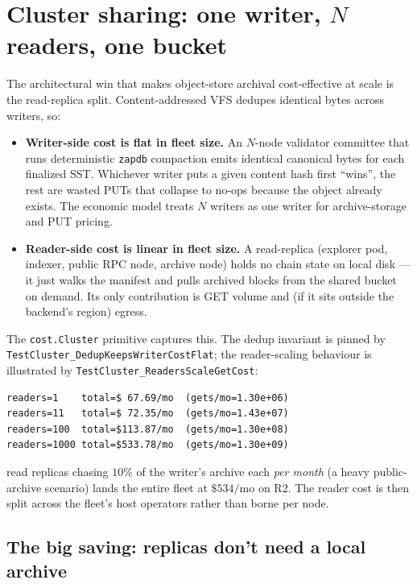 \documentclass[11pt,a4paper]{article}
\begin{document}
\section{Cluster sharing: one writer, $N$ readers, one bucket}
\label{sec:cluster}

The architectural win that makes object-store archival cost-effective
at scale is the read-replica split. Content-addressed VFS dedupes
identical bytes across writers, so:

\begin{itemize}[noitemsep]
  \item \textbf{Writer-side cost is flat in fleet size.} An $N$-node
    validator committee that runs deterministic \texttt{zapdb}
    compaction emits identical canonical bytes for each finalized SST.
    Whichever writer puts a given content hash first ``wins'', the
    rest are wasted PUTs that collapse to no-ops because the object
    already exists. The economic model treats $N$ writers as one
    writer for archive-storage and PUT pricing.
  \item \textbf{Reader-side cost is linear in fleet size.} A
    read-replica (explorer pod, indexer, public RPC node, archive
    node) holds no chain state on local disk --- it just walks the
    manifest and pulls archived blocks from the shared bucket on
    demand. Its only contribution is GET volume and (if it sits
    outside the backend's region) egress.
\end{itemize}

The \texttt{cost.Cluster} primitive captures this. The dedup
invariant is pinned by
\texttt{TestCluster\_DedupKeepsWriterCostFlat}; the reader-scaling
behaviour is illustrated by
\texttt{TestCluster\_ReadersScaleGetCost}:

\begin{lstlisting}
readers=1    total=$ 67.69/mo  (gets/mo=1.30e+06)
readers=11   total=$ 72.35/mo  (gets/mo=1.43e+07)
readers=100  total=$113.87/mo  (gets/mo=1.30e+08)
readers=1000 total=$533.78/mo  (gets/mo=1.30e+09)
\end{lstlisting}

 read replicas chasing $10\%$ of the writer's archive each
\emph{per month} (a heavy public-archive scenario) lands the entire
fleet at $\$534/\text{mo}$ on R2. The reader cost is then split across
the fleet's host operators rather than borne per node.

\subsection{The big saving: replicas don't need a local archive}
\end{document}
